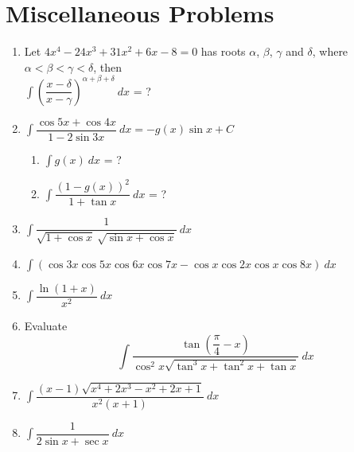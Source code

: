 \documentclass[12pt,a4paper,twoside]{book}
\newcommand{\dint}[1]{\displaystyle{\int #1 \  dx}}
\newcommand{\cosec}[1]{\displaystyle{\text{cosec}\ #1}}
\begin{document}
\section{Miscellaneous Problems}
\begin{enumerate}

\item Let $4x^4-24x^3+31x^2+6x-8=0$ has roots $\alpha$, $\beta$, $\gamma$ and $\delta$, where $\alpha < \beta < \gamma < \delta$, then\\[5pt] $\dint{\left(\dfrac{x-\delta}{x-\gamma}\right)^{\alpha+\beta+\delta}}$ = ?
\item $\dint{\dfrac{\cos 5x +\cos 4x}{1-2\sin 3x}}=-g(x)\sin x +C$
	\begin{enumerate}
	\item $\dint{g(x)}$ = ?
	\item $\dint{\dfrac{(1-g(x))^2}{1+\tan x}}$ = ?
	\end{enumerate}
	
\item $\dint{\dfrac{1}{\sqrt{1+\cos x}\ \sqrt{\sin x+ \cos x}}}$
\item $\dint{(\cos{3x}\cos{5x}\cos{6x}\cos{7x}-\cos{x}\cos{2x}\cos{x}\cos{8x})}$
\item $\dint{\dfrac{\ln{(1+x)}}{x^2}}$
\item Evaluate $$\dint{\dfrac{\tan{\left(\dfrac{\pi}{4}-x\right)}}{\cos^2x\sqrt{\tan^3x+\tan^2x+\tan x}}}$$
\item $\dint{\dfrac{(x-1)\sqrt{x^4+2x^3-x^2+2x+1}}{x^2(x+1)}}$
\item $\dint{\dfrac{1}{2\sin x+\sec x}}$
\end{enumerate}
\end{document}
